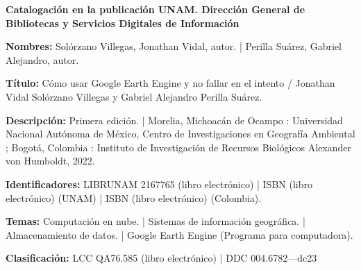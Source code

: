 \newpage

\vspace*{\fill}
\begin{center}
    \begin{blackbox}
        {\footnotesize \textbf{Catalogación en la publicación UNAM. Dirección General de Bibliotecas y Servicios Digitales de Información}

            \textbf{Nombres:} Solórzano Villegas, Jonathan Vidal, autor. | Perilla Suárez, Gabriel Alejandro, autor.  

            \textbf{Título:} Cómo usar Google Earth Engine y no fallar en el intento / Jonathan Vidal Solórzano Villegas y Gabriel Alejandro Perilla Suárez.

            \textbf{Descripción:} Primera edición. | Morelia, Michoacán de Ocampo : Universidad Nacional Autónoma de México, Centro de Investigaciones en Geografía Ambiental ; Bogotá, Colombia : Instituto de Investigación de Recursos Biológicos Alexander von Humboldt, 2022.  
            
            \textbf{Identificadores:} LIBRUNAM 2167765 (libro electrónico) | ISBN (libro electrónico) (UNAM) | ISBN (libro electrónico) (Colombia).    
            
            \textbf{Temas:} Computación en nube. | Sistemas de información geográfica. | Almacenamiento de datos. | Google Earth Engine (Programa para computadora). 
            
            \textbf{Clasificación:} LCC QA76.585 (libro electrónico) | DDC 004.6782—dc23}
        
    \end{blackbox}
%
%            
%
%
%
%
%        
\end{center}

